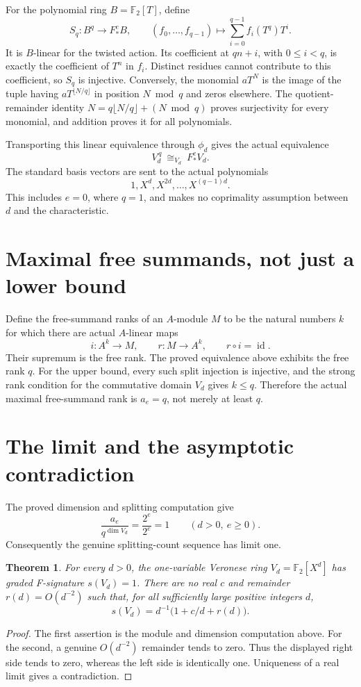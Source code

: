 \documentclass[11pt]{article}
\newtheorem{theorem}{Theorem}
\newcommand{\F}{\mathbb F}
\begin{document}
For the polynomial ring $B=\F_2[T]$, define
\[
 S_q:B^q\longrightarrow F_*^e B,\qquad
 (f_0,\ldots,f_{q-1})\longmapsto
 \sum_{i=0}^{q-1} f_i(T^q)T^i.
\]
It is $B$-linear for the twisted action. Its coefficient at
$qn+i$, with $0\leq i<q$, is exactly the coefficient of $T^n$
in $f_i$. Distinct residues cannot contribute to this coefficient,
so $S_q$ is injective. Conversely, the monomial $aT^N$ is the
image of the tuple having $aT^{\lfloor N/q\rfloor}$ in position
$N\bmod q$ and zeros elsewhere. The quotient-remainder identity
$N=q\lfloor N/q\rfloor+(N\bmod q)$ proves surjectivity for every
monomial, and addition proves it for all polynomials.

Transporting this linear equivalence through $\phi_d$ gives the
actual equivalence
\[
 V_d^{\,q}\ \cong_{V_d}\ F_*^e V_d.
\]
The standard basis vectors are sent to the actual polynomials
\[
 1,X^d,X^{2d},\ldots,X^{(q-1)d}.
\]
This includes $e=0$, where $q=1$, and makes no coprimality
assumption between $d$ and the characteristic.

\section*{Maximal free summands, not just a lower bound}
Define the free-summand ranks of an $A$-module $M$ to be the
natural numbers $k$ for which there are actual $A$-linear maps
\[
 i:A^k\longrightarrow M,\qquad r:M\longrightarrow A^k,
 \qquad r\circ i=\operatorname{id}.
\]
Their supremum is the free rank. The proved equivalence above
exhibits the free rank $q$. For the upper bound, every such split
injection is injective, and the strong rank condition for the
commutative domain $V_d$ gives $k\leq q$. Therefore the actual
maximal free-summand rank is $a_e=q$, not merely at least $q$.

\newpage
\section*{The limit and the asymptotic contradiction}
The proved dimension and splitting computation give
\[
 \frac{a_e}{q^{\dim V_d}}=\frac{2^e}{2^e}=1
 \qquad(d>0,\ e\geq0).
\]
Consequently the genuine splitting-count sequence has limit one.

\begin{theorem}
For every $d>0$, the one-variable Veronese ring
$V_d=\F_2[X^d]$ has graded F-signature $s(V_d)=1$.
There are no real $c$ and remainder $r(d)=O(d^{-2})$ such that,
for all sufficiently large positive integers $d$,
\[
 s(V_d)=d^{-1}\bigl(1+c/d+r(d)\bigr).
\]
\end{theorem}
\begin{proof}
The first assertion is the module and dimension computation above.
For the second, a genuine $O(d^{-2})$ remainder tends to zero.
Thus the displayed right side tends to zero, whereas the left side
is identically one. Uniqueness of a real limit gives a contradiction.
\end{proof}
\end{document}
